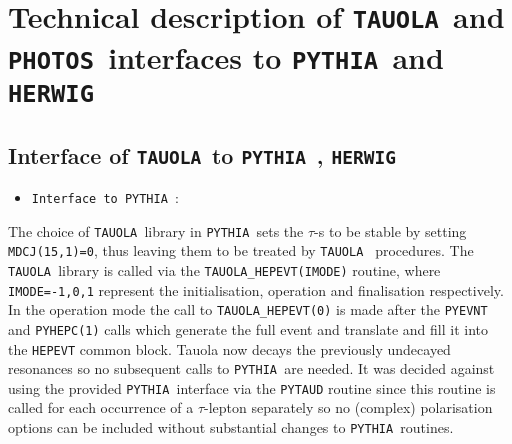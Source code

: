 \documentclass[a4paper,12pt]{article}
\newcommand{\pythia}{{\tt PYTHIA }}
\newcommand{\herwig}{{\tt HERWIG }}
\newcommand{\tauola}{{\tt TAUOLA }}
\newcommand{\photos}{{\tt PHOTOS }}
\begin{document}
\boldmath 
\section{Technical description of \tauola and \photos interfaces to \pythia and \herwig} 
\unboldmath


\boldmath 
\subsection{Interface of \tauola to \pythia, \herwig} 
\unboldmath

\begin{itemize}
\item{\tt Interface to \pythia}:
\end{itemize}

The choice of \tauola library in \pythia sets the $\tau$-s to be stable by
setting {\tt MDCJ(15,1)=0}, thus leaving them to be treated by \tauola
procedures. The
\tauola library is called via the {\tt TAUOLA\_HEPEVT(IMODE)} routine, where {\tt
IMODE=-1,0,1} represent the initialisation, operation and finalisation
respectively. In the operation mode the call to {\tt TAUOLA\_HEPEVT(0)} is made
after the {\tt PYEVNT} and {\tt PYHEPC(1)} calls which generate the full event and
translate and fill it into the {\tt HEPEVT} common block. Tauola now decays the previously
undecayed resonances so no subsequent calls to \pythia are needed. It was
decided against using the provided \pythia interface via the {\tt PYTAUD}
routine since this routine is called for each occurrence of a $\tau$-lepton
separately so no (complex) polarisation options can be included without
substantial changes to \pythia routines.
\end{document}
